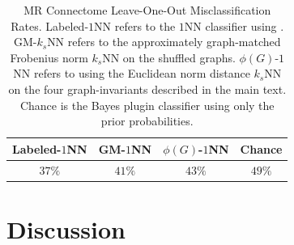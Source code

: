 % 
% 

\begin{table}[h!]
\caption{MR Connectome Leave-One-Out Misclassification Rates. Labeled-$1$NN refers to the $1$NN classifier using . GM-$k_s$NN refers to the approximately graph-matched Frobenius norm $k_s$NN on the shuffled graphs.  $\phi(G)$-$1$NN refers to using the Euclidean norm distance $k_s$NN on the four graph-invariants described in the main text. Chance is the Bayes plugin classifier using only the prior probabilities.  }
\begin{center}
\begin{tabular}{|c|c|c|c|}
\hline
Labeled-$1$NN & GM-$1$NN & $\phi(G)$-$1$NN & Chance\\
\hline
$37\%$ & $41\%$ & $43\%$ & $49\%$ \\
    \hline
\end{tabular}
\end{center}
\label{tab:connectome}
\end{table}%


\section{Discussion}

